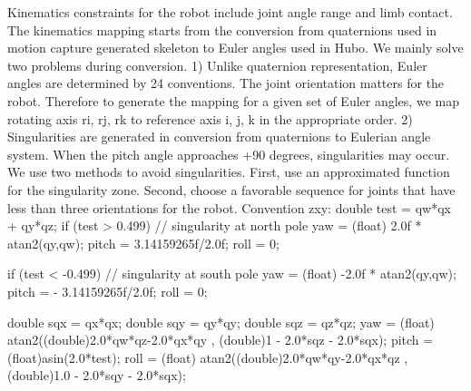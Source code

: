 Kinematics constraints for the robot include joint angle range and limb contact. 
The kinematics mapping starts from the conversion from quaternions used in motion capture generated skeleton to Euler angles used in Hubo. 
We mainly solve two problems during conversion.  1) Unlike quaternion representation, Euler angles are determined by 24 conventions.  The joint orientation matters for the robot.  Therefore to generate the mapping for a given set of Euler angles, we map rotating axis ri, rj, rk to reference axis i, j, k in the appropriate order.  2) Singularities are generated in conversion from quaternions to Eulerian angle system. When the pitch angle approaches +90 degrees, singularities may occur. We use two methods to avoid singularities. First, use an approximated function for the singularity zone. Second, choose a favorable sequence for joints that have less than three orientations for the robot.
Convention zxy: 
double test = qw*qx + qy*qz;
if (test > 0.499) // singularity at north pole
		yaw = (float) 2.0f * atan2(qy,qw);
		pitch = 3.14159265f/2.0f;
		roll = 0;

if (test < -0.499) // singularity at south pole
		yaw = (float) -2.0f * atan2(qy,qw);
		pitch = - 3.14159265f/2.0f;
		roll = 0;
        

    double sqx = qx*qx;
    double sqy = qy*qy;
    double sqz = qz*qz;
yaw = (float) atan2((double)2.0*qw*qz-2.0*qx*qy , (double)1 - 2.0*sqz - 2.0*sqx);
pitch = (float)asin(2.0*test);
roll = (float) atan2((double)2.0*qw*qy-2.0*qx*qz , (double)1.0 - 2.0*sqy - 2.0*sqx);


